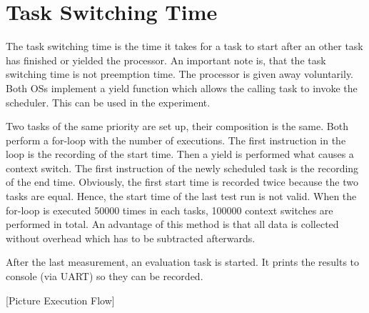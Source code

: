 \section{Task Switching Time} 
The task switching time is the time it takes for a task to start after an other task has finished or yielded the processor.
An important note is, that the task switching time is not preemption time.
The processor is given away voluntarily.
Both \acp{OS} implement a yield function which allows the calling task to invoke the scheduler.
This can be used in the experiment.
\par
Two tasks of the same priority are set up, their composition is the same. 
Both perform a for-loop with the number of executions.
The first instruction in the loop is the recording of the start time.
Then a yield is performed what causes a context switch. 
The first instruction of the newly scheduled task is the recording of the end time.
Obviously, the first start time is recorded twice because the two tasks are equal.
Hence, the start time of the last test run is not valid.
When the for-loop is executed 50000 times in each tasks, 100000 context switches are performed in total.
An advantage of this method is that all data is collected without overhead which has to be subtracted afterwards.
\par
After the last measurement, an evaluation task is started.
It prints the results to console (via \ac{UART}) so they can be recorded. 

[Picture Execution Flow]


